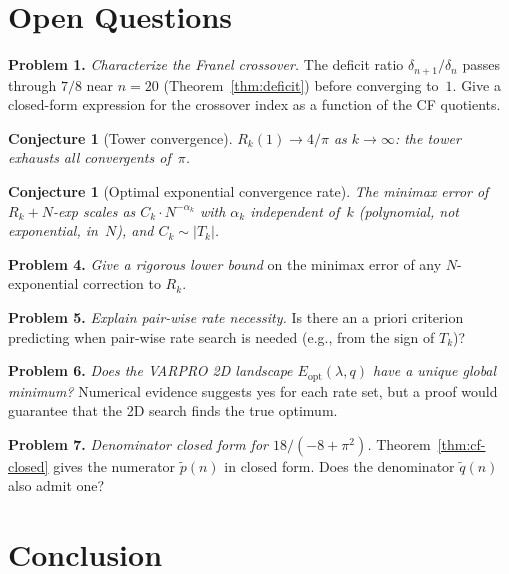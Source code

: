 \documentclass[12pt]{article}
\newtheorem{conjecture}[theorem]{Conjecture}
\begin{document}
\section{Open Questions}\label{sec:open}

\textbf{Problem 1.} \emph{Characterize the Franel crossover.} The deficit ratio $\delta_{n+1}/\delta_n$ passes through $7/8$ near $n = 20$ (Theorem~\ref{thm:deficit}) before converging to~$1$.  Give a closed-form expression for the crossover index as a function of the CF quotients.

\begin{conjecture}[Tower convergence]
$R_k(1) \to 4/\pi$ as $k \to \infty$: the tower exhausts all convergents of~$\pi$.
\end{conjecture}

\begin{conjecture}[Optimal exponential convergence rate]
The minimax error of $R_k + N$-exp scales as $C_k \cdot N^{-\alpha_k}$
with $\alpha_k$ independent of~$k$ (polynomial, not exponential, in~$N$),
and $C_k \sim |T_k|$.
\end{conjecture}

\textbf{Problem 4.} \emph{Give a rigorous lower bound} on the minimax error of any $N$-exponential correction to $R_k$.

\textbf{Problem 5.} \emph{Explain pair-wise rate necessity.} Is there an a priori criterion predicting when pair-wise rate search is needed (e.g., from the sign of $T_k$)?

\textbf{Problem 6.} \emph{Does the VARPRO 2D landscape $E_{\mathrm{opt}}(\lambda,q)$ have a unique global minimum?} Numerical evidence suggests yes for each rate set, but a proof would guarantee that the 2D search finds the true optimum.

\textbf{Problem 7.} \emph{Denominator closed form for $18/(-8+\pi^2)$.} Theorem~\ref{thm:cf-closed} gives the numerator $\tilde{p}(n)$ in closed form.  Does the denominator $\tilde{q}(n)$ also admit one?

\section{Conclusion}\label{sec:conclusion}
\end{document}
